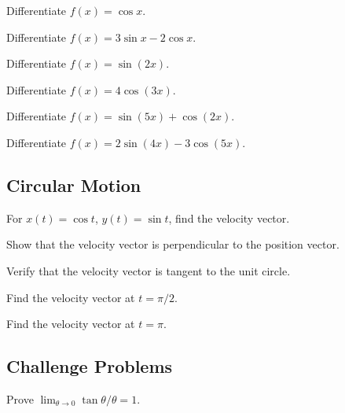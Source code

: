 \begin{exercise}
Differentiate $f(x) = \cos x$.
\end{exercise}

\begin{exercise}
Differentiate $f(x) = 3\sin x - 2\cos x$.
\end{exercise}

\begin{exercise}
Differentiate $f(x) = \sin(2x)$.
\end{exercise}

\begin{exercise}
Differentiate $f(x) = 4\cos(3x)$.
\end{exercise}

\begin{exercise}
Differentiate $f(x) = \sin(5x) + \cos(2x)$.
\end{exercise}

\begin{exercise}
Differentiate $f(x) = 2\sin(4x) - 3\cos(5x)$.
\end{exercise}

\subsection*{Circular Motion}
\begin{exercise}
For $x(t) = \cos t$, $y(t) = \sin t$, find the velocity vector.
\end{exercise}

\begin{exercise}
Show that the velocity vector is perpendicular to the position vector.
\end{exercise}

\begin{exercise}
Verify that the velocity vector is tangent to the unit circle.
\end{exercise}

\begin{exercise}
Find the velocity vector at $t = \pi/2$.
\end{exercise}

\begin{exercise}
Find the velocity vector at $t = \pi$.
\end{exercise}

\subsection*{Challenge Problems}
\begin{exercise}
Prove $\lim_{\theta\to0} \tan\theta/\theta = 1$.
\end{exercise}

